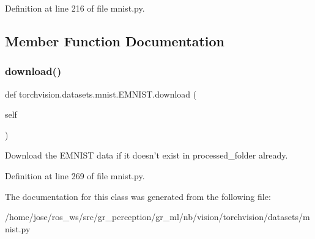 Definition at line 216 of file mnist.\+py.



\subsection{Member Function Documentation}
\mbox{\label{classtorchvision_1_1datasets_1_1mnist_1_1EMNIST_a310e4e3b50dff00290065d416060248c}} 
\subsubsection{\texorpdfstring{download()}{download()}}
{\footnotesize\ttfamily def torchvision.\+datasets.\+mnist.\+E\+M\+N\+I\+S\+T.\+download (\begin{DoxyParamCaption}\item[{}]{self }\end{DoxyParamCaption})}

\begin{DoxyVerb}Download the EMNIST data if it doesn't exist in processed_folder already.\end{DoxyVerb}
 

Definition at line 269 of file mnist.\+py.



The documentation for this class was generated from the following file\+:\begin{DoxyCompactItemize}
\item 
/home/jose/ros\+\_\+ws/src/gr\+\_\+perception/gr\+\_\+ml/nb/vision/torchvision/datasets/mnist.\+py\end{DoxyCompactItemize}

